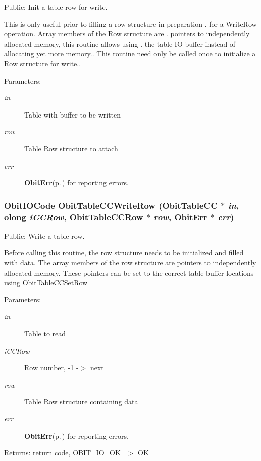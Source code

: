 Public: Init a table row for write. 

This is only useful prior to filling a row structure in preparation . for a Write\-Row operation. Array members of the Row structure are . pointers to independently allocated memory, this routine allows using . the table IO buffer instead of allocating yet more memory.. This routine need only be called once to initialize a Row structure for write.. \begin{Desc}
\item[Parameters:]
\begin{description}
\item[{\em in}]Table with buffer to be written \item[{\em row}]Table Row structure to attach \item[{\em err}]{\bf Obit\-Err}{\rm (p.\,\pageref{structObitErr})} for reporting errors. \end{description}
\end{Desc}
\subsubsection{\setlength{\rightskip}{0pt plus 5cm}Obit\-IOCode Obit\-Table\-CCWrite\-Row ({\bf Obit\-Table\-CC} $\ast$ {\em in}, {\bf olong} {\em i\-CCRow}, {\bf Obit\-Table\-CCRow} $\ast$ {\em row}, {\bf Obit\-Err} $\ast$ {\em err})}\label{ObitTableCC_8h_a20}


Public: Write a table row. 

Before calling this routine, the row structure needs to be initialized and filled with data. The array members of the row structure are pointers to independently allocated memory. These pointers can be set to the correct table buffer locations using Obit\-Table\-CCSet\-Row \begin{Desc}
\item[Parameters:]
\begin{description}
\item[{\em in}]Table to read \item[{\em i\-CCRow}]Row number, -1 -$>$ next \item[{\em row}]Table Row structure containing data \item[{\em err}]{\bf Obit\-Err}{\rm (p.\,\pageref{structObitErr})} for reporting errors. \end{description}
\end{Desc}
\begin{Desc}
\item[Returns:]return code, OBIT\_\-IO\_\-OK=$>$ OK \end{Desc}
